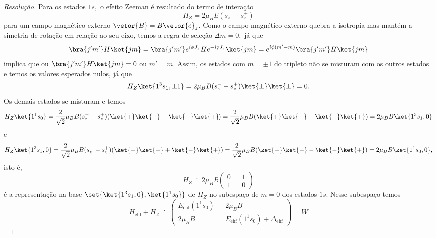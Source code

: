 \begin{proof}[Resolução]
   Para os estados \(1s,\) o efeito Zeeman é resultado do termo de interação
   \begin{equation*}
      H_Z = 2\mu_B B \left(s^-_z - s^+_z\right)
   \end{equation*}
   para um campo magnético externo \(\vetor{B} = B\vetor{e}_z\). Como o campo magnético externo quebra a isotropia mas mantém a simetria de rotação em relação ao seu eixo, temos a regra de seleção \(\Delta m = 0,\) já que 
   \begin{equation*}
      \bra{j'm'}H\ket{jm} = \bra{j'm'}e^{i\phi J_z} H e^{-i\phi J_z} \ket{jm} = e^{i\phi(m' - m)} \bra{j'm'}H\ket{jm}
   \end{equation*}
   implica que ou \(\bra{j'm'}H\ket{jm} = 0\) ou \(m' = m.\) Assim, os estados com \(m = \pm1\) do tripleto não se misturam com os outros estados e temos os valores esperados nulos, já que
   \begin{equation*}
      H_Z\ket{1^3s_1,\pm1} = 2\mu_B B (s_z^- - s_z^+) \ket{\pm}\ket{\pm} = 0.
   \end{equation*}
   Os demais estados se misturam e temos
   \begin{equation*}
      H_Z \ket{1^1s_0} = \frac{2}{\sqrt{2}}\mu_BB(s_z^- - s_z^+) (\ket{+}\ket{-} - \ket{-}\ket{+}) = \frac{2}{\sqrt{2}} \mu_BB(\ket{+}\ket{-} + \ket{-}\ket{+}) = 2\mu_BB \ket{1^3s_1,0}
   \end{equation*}
   e
   \begin{equation*}
      H_Z \ket{1^3s_1,0} = \frac{2}{\sqrt{2}}\mu_BB(s_z^- - s_z^+) (\ket{+}\ket{-} + \ket{-}\ket{+}) = \frac{2}{\sqrt{2}} \mu_BB(\ket{+}\ket{-} - \ket{-}\ket{+}) = 2\mu_BB \ket{1^1s_0,0},
   \end{equation*}
   isto é, 
   \begin{equation*}
       H_Z \doteq 2\mu_B B\begin{pmatrix}
          0 && 1\\
          1 && 0
       \end{pmatrix}
   \end{equation*}
   é a representação na base \(\set{\ket{1^3s_1,0}, \ket{1^1s_0}}\) de \(H_Z\) no subespaço de \(m = 0\) dos estados \(1s.\) Nesse subespaço temos
   \begin{equation*}
      H_\mathrm{ehf} + H_Z \doteq \begin{pmatrix}
         E_{\mathrm{ehf}}(1^1s_0) && 2\mu_B B\\
      2\mu_B B && E_{\mathrm{ehf}}(1^1s_0) + \Delta_{\mathrm{ehf}}
   \end{pmatrix} = W

\end{equation*}
\end{proof}
